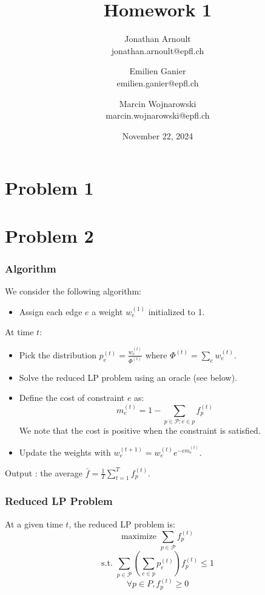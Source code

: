 \documentclass[a4paper, 11pt]{article}
\title{Homework 1}
\author{
    Jonathan Arnoult \\ jonathan.arnoult@epfl.ch
    \and Emilien Ganier \\ emilien.ganier@epfl.ch
    \and Marcin Wojnarowski \\ marcin.wojnarowski@epfl.ch
}
\date{November 22, 2024}
\begin{document}
\maketitle

\section{Problem 1}

\section{Problem 2}

\subsubsection*{Algorithm}

We consider the following algorithm:

\begin{itemize}
    \item Assign each edge $e$ a weight $w_e^{(1)}$ initialized to 1.
\end{itemize}
At time $t$: %
\begin{itemize}
    \item Pick the distribution $p_e^{(t)} = \frac{w_e^{(t)}}{\Phi^{(t)}}$ where $\Phi^{(t)} = \sum_{e} w_e^{(t)}$.
    \item Solve the reduced LP problem using an oracle (see below).
    \item Define the cost of constraint $e$ as:
        $$\boxed{m_e^{(t)} = 1 - \sum_{p\in\mathcal{P} : e \in p} f_p^{(t)}}$$
        We note that the cost is positive when the constraint is satisfied.
    \item Update the weights with $w_e^{(t+1)} = w_e^{(t)} e^{-\epsilon m_e^{(t)}}$.
\end{itemize}

Output : the average $\bar{f} = \frac{1}{T}\sum_{t = 1}^{T}f_p^{(t)}$.

\subsubsection*{Reduced LP Problem}

At a given time $t$, the reduced LP problem is:
$$\text{maximize } \sum_{p \in \mathcal{P}} f_p^{(t)}$$
$$\text{s.t. } \sum_{p \in \mathcal{P}} \left(\sum_{e \in p} p_e^{(t)}\right)f_p^{(t)} \le 1$$
$$\forall p \in P, f_p^{(t)} \ge 0$$
\end{document}
